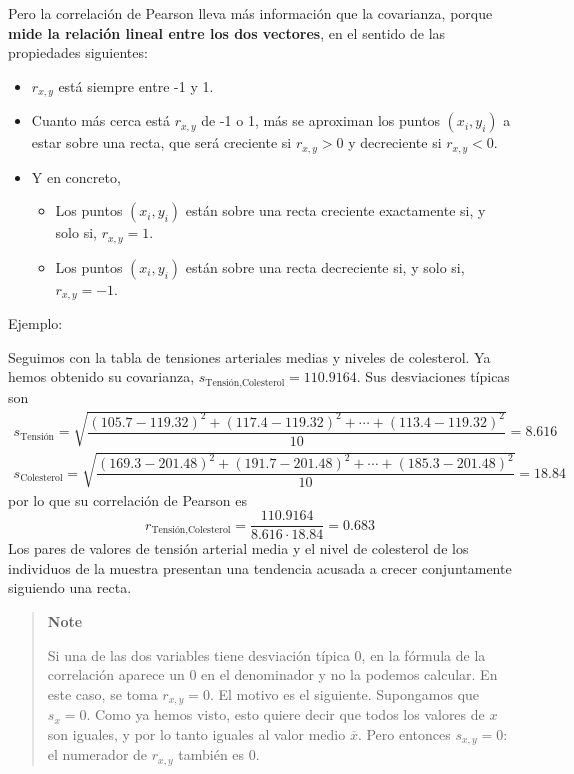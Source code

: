 \documentclass[
  spanish,
  letterpaper,
  DIV=11,
  numbers=noendperiod]{scrreprt}
\providecommand{\tightlist}{%
  \setlength{\itemsep}{0pt}\setlength{\parskip}{0pt}}
\begin{document}
\begin{tcolorbox}
Pero la correlación de Pearson lleva más información que la covarianza,
porque \textbf{mide la relación lineal entre los dos vectores}, en el
sentido de las propiedades siguientes:

\begin{itemize}
\item
  \(r_{x,y}\) está siempre entre -1 y 1.
\item
  Cuanto más cerca está \(r_{x,y}\) de -1 o 1, más se aproximan los
  puntos \((x_i,y_i)\) a estar sobre una recta, que será creciente si
  \(r_{x,y}>0\) y decreciente si \(r_{x,y}<0\).
\item
  Y en concreto,

  \begin{itemize}
  \tightlist
  \item
    Los puntos \((x_i,y_i)\) están sobre una recta creciente exactamente
    si, y solo si, \(r_{x,y}=1\).
  \item
    Los puntos \((x_i,y_i)\) están sobre una recta decreciente si, y
    solo si, \(r_{x,y}=-1\).
  \end{itemize}
\end{itemize}

Ejemplo:

Seguimos con la tabla de tensiones arteriales medias y niveles de
colesterol. Ya hemos obtenido su covarianza,
\(s_{\text{Tensión},\text{Colesterol}}=110.9164\). Sus desviaciones
típicas son \[
\begin{array}{l}
s_{\text{Tensión}}=\sqrt{\dfrac{(105.7-119.32)^2+(117.4-119.32)^2+\cdots+(113.4-119.32)^2}{10}}=8.616\\
s_{\text{Colesterol}}=\sqrt{\dfrac{(169.3-201.48)^2+(191.7-201.48)^2+\cdots+(185.3-201.48)^2}{10}}=18.84
\end{array}
\] por lo que su correlación de Pearson es \[
r_{\text{Tensión},\text{Colesterol}}=\frac{110.9164}{8.616\cdot 18.84}=0.683
\] Los pares de valores de tensión arterial media y el nivel de
colesterol de los individuos de la muestra presentan una tendencia
acusada a crecer conjuntamente siguiendo una recta.

\begin{quote}
\textbf{Note}

Si una de las dos variables tiene desviación típica 0, en la fórmula de
la correlación aparece un 0 en el denominador y no la podemos calcular.
En este caso, se toma \(r_{x,y}=0\). El motivo es el siguiente.
Supongamos que \(s_x=0\). Como ya hemos visto, esto quiere decir que
todos los valores de \(x\) son iguales, y por lo tanto iguales al valor
medio \(\overline{x}\). Pero entonces \(s_{x,y}=0\): el numerador de
\(r_{x,y}\) también es 0.


\end{quote}
\end{tcolorbox}
\end{document}

